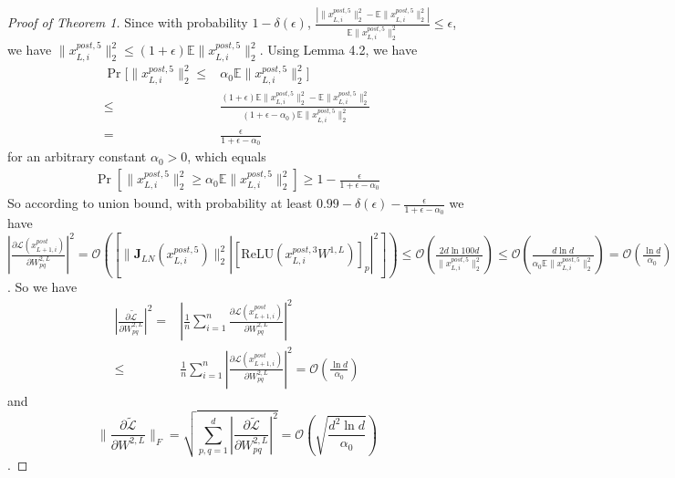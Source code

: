 \documentclass{article}
\begin{document}
\begin{proof}[Proof of Theorem 1]
Since with probability $1-\delta(\epsilon)$, $\frac{|\|x^{post,5}_{L,i}\|_2^2-\mathbb{E}\|x^{post,5}_{L,i}\|_2^2|}{\mathbb{E}\|x^{post,5}_{L,i}\|_2^2}\leq \epsilon$, we have $\|x^{post,5}_{L,i}\|_2^2\leq (1+\epsilon)\mathbb{E}\|x^{post,5}_{L,i}\|_2^2$. Using Lemma 4.2, we have
\begin{align}
\operatorname{Pr}[\|x^{post,5}_{L,i}\|_2^2\leq& \alpha_0 \mathbb{E}\|x^{post,5}_{L,i}\|_2^2]\\\leq & \frac{(1+\epsilon)\mathbb{E}\|x^{post,5}_{L,i}\|_2^2-\mathbb{E}\|x^{post,5}_{L,i}\|_2^2}{(1+\epsilon-\alpha_0)\mathbb{E}\|x^{post,5}_{L,i}\|_2^2}\\
=&\frac{\epsilon}{1+\epsilon-\alpha_0}
\end{align}
for an arbitrary constant $\alpha_0>0$, which equals
\begin{align}
\operatorname{Pr}[\|x^{post,5}_{L,i}\|_2^2\geq \alpha_0 \mathbb{E}\|x^{post,5}_{L,i}\|_2^2]
\geq 1-\frac{\epsilon}{1+\epsilon-\alpha_0}
\end{align}
So according to union bound, with probability at least $0.99-\delta(\epsilon)-\frac{\epsilon}{1+\epsilon-\alpha_0}$ we have $|\frac{\partial\mathcal{L}(x_{L+1,i}^{post})}{\partial W^{2,L}_{pq}}|^2=\mathcal{O}(\left[\|\mathbf{J}_{LN}(x_{L,i}^{post,5})\|^2_2|[\text{ReLU}(x_{L,i}^{post,3}W^{1,L})]_p|^2\right])\leq \mathcal{O}(\frac{2d\ln{100d}}{\|x_{L,i}^{post,5}\|_2^2})\leq \mathcal{O}(\frac{d\ln{d}}{\alpha_0\mathbb{E}\|x_{L,i}^{post,5}\|_2^2})=\mathcal{O}(\frac{\ln{d}}{\alpha_0})$. So we have
\begin{align}
 |\frac{\partial \tilde{\mathcal{L}}}{\partial W^{2,L}_{pq}}|^2= &|\frac{1}{n}\sum_{i=1}^n \frac{\partial \mathcal{L}(x_{L+1,i}^{post})}{\partial W^{2,L}_{pq}}|^2\\
 \leq &\frac{1}{n}\sum_{i=1}^n  |\frac{\partial \mathcal{L}(x_{L+1,i}^{post})}{\partial W^{2,L}_{pq}}|^2=\mathcal{O}(\frac{\ln{d}}{\alpha_0})
\end{align}
and $$ \|\frac{\partial \tilde{\mathcal{L}}}{\partial W^{2,L}}\|_F= \sqrt{\sum_{p,q=1}^d|\frac{\partial \tilde{\mathcal{L}}}{\partial W^{2,L}_{pq}}|^2}=\mathcal{O}(\sqrt{\frac{d^2\ln{d}}{\alpha_0}})$$.


\end{proof}
\end{document}
